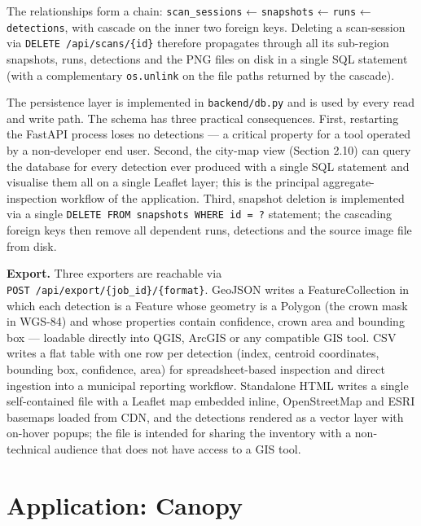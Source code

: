 The relationships form a chain: \texttt{scan\_sessions} ← \texttt{snapshots} ← \texttt{runs} ← \texttt{detections}, with cascade on the inner two foreign keys. Deleting a scan-session via \texttt{DELETE\ /api/scans/\{id\}} therefore propagates through all its sub-region snapshots, runs, detections and the PNG files on disk in a single SQL statement (with a complementary \texttt{os.unlink} on the file paths returned by the cascade).

The persistence layer is implemented in \texttt{backend/db.py} and is used by every read and write path. The schema has three practical consequences. First, restarting the FastAPI process loses no detections --- a critical property for a tool operated by a non-developer end user. Second, the city-map view (Section 2.10) can query the database for every detection ever produced with a single SQL statement and visualise them all on a single Leaflet layer; this is the principal aggregate-inspection workflow of the application. Third, snapshot deletion is implemented via a single \texttt{DELETE\ FROM\ snapshots\ WHERE\ id\ =\ ?} statement; the cascading foreign keys then remove all dependent runs, detections and the source image file from disk.

\textbf{Export.} Three exporters are reachable via \texttt{POST\ /api/export/\{job\_id\}/\{format\}}. GeoJSON writes a FeatureCollection in which each detection is a Feature whose geometry is a Polygon (the crown mask in WGS-84) and whose properties contain confidence, crown area and bounding box --- loadable directly into QGIS, ArcGIS or any compatible GIS tool. CSV writes a flat table with one row per detection (index, centroid coordinates, bounding box, confidence, area) for spreadsheet-based inspection and direct ingestion into a municipal reporting workflow. Standalone HTML writes a single self-contained file with a Leaflet map embedded inline, OpenStreetMap and ESRI basemaps loaded from CDN, and the detections rendered as a vector layer with on-hover popups; the file is intended for sharing the inventory with a non-technical audience that does not have access to a GIS tool.

\section{Application: Canopy}\label{application-canopy}

